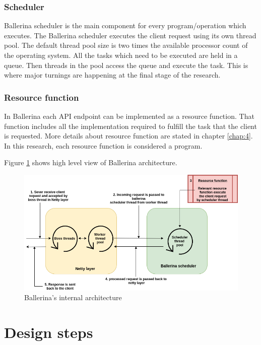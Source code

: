 \subsubsection{Scheduler}

Ballerina scheduler is the main component for every program/operation which executes. The Ballerina scheduler executes the client request using its own thread pool. The default thread pool size is two times the available processor count of the operating system. All the tasks which need to be executed are held in a queue. Then threads in the pool access the queue and execute the task. This is where major turnings are happening at the final stage of the research. 

\subsubsection{Resource function}

In Ballerina each API endpoint can be implemented as a resource function. That function includes all the implementation required to fulfill the task that the client is requested. More details about resource function are stated in chapter \ref{chap:4}. In this research, each resource function is considered a program.


Figure \ref{bal_internal} shows high level view of Ballerina architecture.

\begin{figure}[htbp]
	\begin{center}
		\includegraphics[scale=0.5]{figures/bal-internal.png}
	\end{center}
	\caption{Ballerina's internal architecture}
	\label{bal_internal}
\end{figure}

\section{Design steps}

